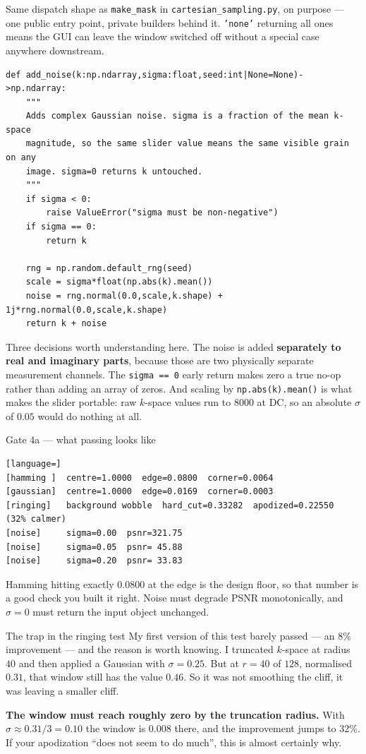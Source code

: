 \documentclass[11pt,a4paper]{article}
\begin{document}
Same dispatch shape as \texttt{make\_mask} in \texttt{cartesian\_sampling.py}, on
purpose --- one public entry point, private builders behind it. \texttt{'none'}
returning all ones means the GUI can leave the window switched off without a
special case anywhere downstream.

\begin{lstlisting}
def add_noise(k:np.ndarray,sigma:float,seed:int|None=None)->np.ndarray:
    """
    Adds complex Gaussian noise. sigma is a fraction of the mean k-space
    magnitude, so the same slider value means the same visible grain on any
    image. sigma=0 returns k untouched.
    """
    if sigma < 0:
        raise ValueError("sigma must be non-negative")
    if sigma == 0:
        return k

    rng = np.random.default_rng(seed)
    scale = sigma*float(np.abs(k).mean())
    noise = rng.normal(0.0,scale,k.shape) + 1j*rng.normal(0.0,scale,k.shape)
    return k + noise
\end{lstlisting}

Three decisions worth understanding here. The noise is added \textbf{separately
to real and imaginary parts}, because those are two physically separate
measurement channels. The \texttt{sigma == 0} early return makes zero a true
no-op rather than adding an array of zeros. And scaling by
\texttt{np.abs(k).mean()} is what makes the slider portable: raw $k$-space values
run to $8000$ at DC, so an absolute $\sigma$ of $0.05$ would do nothing at all.

\begin{gatebox}{Gate 4a --- what passing looks like}
\begin{lstlisting}[language=]
[hamming ]  centre=1.0000  edge=0.0800  corner=0.0064
[gaussian]  centre=1.0000  edge=0.0169  corner=0.0003
[ringing]   background wobble  hard_cut=0.33282  apodized=0.22550  (32% calmer)
[noise]     sigma=0.00  psnr=321.75
[noise]     sigma=0.05  psnr= 45.88
[noise]     sigma=0.20  psnr= 33.83
\end{lstlisting}
Hamming hitting exactly $0.0800$ at the edge is the design floor, so that number
is a good check you built it right. Noise must degrade PSNR monotonically, and
$\sigma=0$ must return the input object unchanged.
\end{gatebox}

\begin{bugbox}{The trap in the ringing test}
My first version of this test barely passed --- an 8\% improvement --- and the
reason is worth knowing. I truncated $k$-space at radius $40$ and then applied a
Gaussian with $\sigma=0.25$. But at $r=40$ of $128$, normalised $0.31$, that
window still has the value $0.46$. So it was not smoothing the cliff, it was
leaving a smaller cliff.

\textbf{The window must reach roughly zero by the truncation radius.} With
$\sigma \approx 0.31/3 = 0.10$ the window is $0.008$ there, and the improvement
jumps to 32\%. If your apodization ``does not seem to do much'', this is almost
certainly why.
\end{bugbox}
\end{document}

